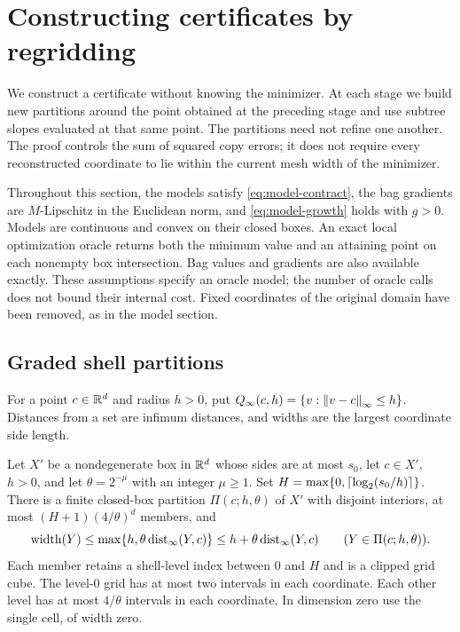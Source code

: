 \section{Constructing certificates by regridding}
\label{sec:regridding}

We construct a certificate without knowing the minimizer. At each stage we
build new partitions around the point obtained at the preceding stage and
use subtree slopes evaluated at that same point. The partitions need not
refine one another. The proof controls the sum of squared copy errors;
it does not require every reconstructed coordinate to lie within the
current mesh width of the minimizer.

Throughout this section, the models satisfy \eqref{eq:model-contract},
the bag gradients are $M$-Lipschitz in the Euclidean norm, and
\eqref{eq:model-growth} holds with $g>0$. Models are continuous and convex
on their closed boxes. An exact local optimization oracle returns both
the minimum value and an attaining point on each nonempty box
intersection. Bag values and gradients are also available exactly.
These assumptions specify an oracle model; the number of oracle calls
does not bound their internal cost. Fixed coordinates of the original
domain have been removed, as in the model section.

\subsection{Graded shell partitions}

For a point $c\in\mathbb R^d$ and radius $h>0$, put
$Q_\infty(c,h)=\{v:\left\lVert v-c\right\rVert_\infty\le h\}$. Distances from a set are
infimum distances, and widths are the largest coordinate side length.

\begin{lemma}\label{lem:regridding-shell}
Let $X'$ be a nondegenerate box in $\mathbb R^d$ whose sides are at most $s_0$,
let $c\in X'$, $h>0$, and let $\theta=2^{-\mu}$ with an integer
$\mu\ge1$. Set $H=\max\{0,\left\lceil \log_2(s_0/h)\right\rceil\}$. There is a finite
closed-box partition $\Pi(c;h,\theta)$ of $X'$ with disjoint interiors,
at most $(H+1)(4/\theta)^d$ members, and
\begin{equation}\label{eq:regridding-shell}
 \operatorname{width}(Y)\le\max\{h,\theta\operatorname{dist}_\infty(Y,c)\}
 \le h+\theta\operatorname{dist}_\infty(Y,c)
 \qquad (Y\in\Pi(c;h,\theta)).
\end{equation}
Each member retains a shell-level index between $0$ and $H$ and is a
clipped grid cube. The level-$0$ grid has at most two intervals in each
coordinate. Each other level has at most $4/\theta$ intervals in each
coordinate. In dimension zero use the single cell, of width zero.
\end{lemma}

